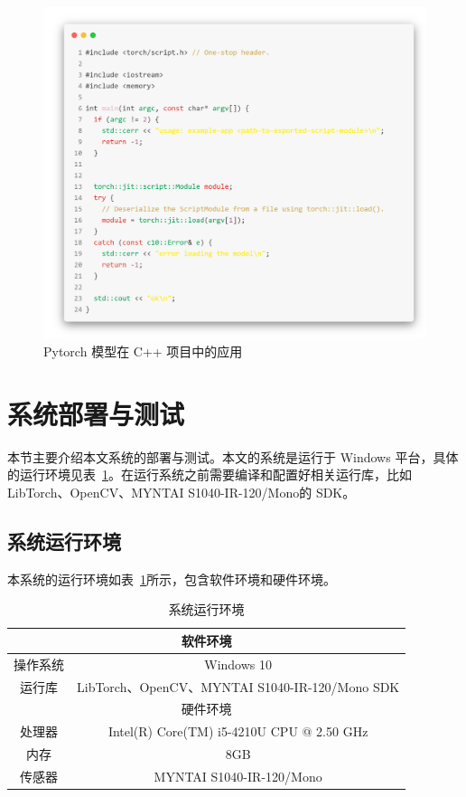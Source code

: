 \begin{figure}[htbp]
    \centering
    \includegraphics[width=0.6\linewidth]{figures/code-cpp.png}
    \caption{Pytorch 模型在 C++ 项目中的应用}
    \label{fig:code_cpp}
\end{figure}

\section{系统部署与测试}
本节主要介绍本文系统的部署与测试。本文的系统是运行于 Windows 平台，具体的运行环境见表~\ref{tab:env2}。在运行系统之前需要编译和配置好相关运行库，比如 LibTorch、OpenCV、MYNTAI S1040-IR-120/Mono的 SDK。

\subsection{系统运行环境}
本系统的运行环境如表~\ref{tab:env2}所示，包含软件环境和硬件环境。
\begin{table}[thbp]
  \centering
  \small{}\setlength{}
  \caption{系统运行环境}
  \begin{tabular}{|c|c|}
    \hline
    \multicolumn{2}{|c|}{软件环境}                \\
    \hline
    操作系统   & Windows 10 \\
    \hline
    运行库   & LibTorch、OpenCV、MYNTAI S1040-IR-120/Mono SDK \\
    \hline
    \multicolumn{2}{|c|}{硬件环境} \\
    \hline
    处理器    &      Intel(R) Core(TM) i5-4210U CPU @ 2.50 GHz  \\
    \hline
    内存      &       8GB         \\
    \hline
    传感器    &     MYNTAI S1040-IR-120/Mono          \\
    \hline
  \end{tabular}
  \label{tab:env2}
\end{table}

